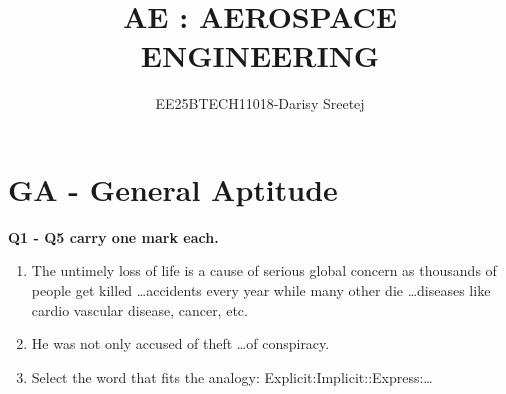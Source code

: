 \documentclass[journal,12pt,onecolumn]{IEEEtran}
\title{ AE : AEROSPACE ENGINEERING}
\author{EE25BTECH11018-Darisy Sreetej}
\theoremstyle{remark}
\begin{document}
\maketitle

\section{GA - General Aptitude}
\textbf{Q1 - Q5 carry one mark each.}

\begin{enumerate}
   
\item The untimely loss of life is a cause of serious global concern as thousands of people get killed \dots accidents every year while many other die \dots diseases like cardio vascular disease, cancer, etc.  
\begin{enumerate}
\end{enumerate}


\item He was not only accused of theft \dots of conspiracy.  
\begin{enumerate}
\end{enumerate}


\item Select the word that fits the analogy:  
Explicit:Implicit::Express:\dots
\begin{enumerate}
\end{enumerate}



\end{enumerate}
\end{document}
